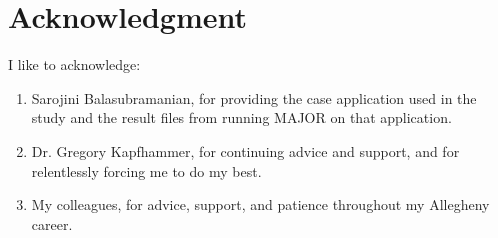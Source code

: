 \chapter*{Acknowledgment}\label{ch:ack}

I like to acknowledge:

\begin{enumerate}

\item[]
Sarojini Balasubramanian, for providing the case application used in the study and the result files from running MAJOR on that application.

\item[]
Dr. Gregory Kapfhammer, for continuing advice and support, and for relentlessly forcing me to do my best.

\item[]
My colleagues, for advice, support, and patience throughout my Allegheny career.

\end{enumerate}

